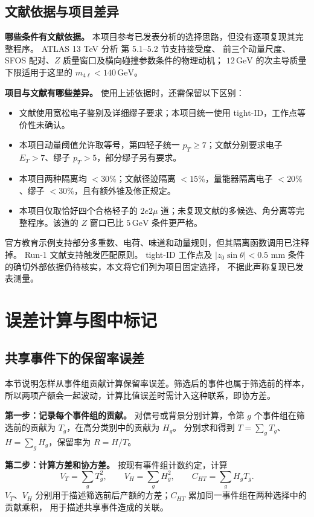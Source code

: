 \documentclass[11pt,a4paper,fontset=fandol,scheme=plain]{ctexart}
\newcommand{\gev}{\,\mathrm{GeV}}
\begin{document}
\subsection{文献依据与项目差异}
\textbf{哪些条件有文献依据。} 本项目参考已发表分析的选择思路，但没有逐项复现其完整程序。
ATLAS 13 TeV 分析\cite{ATLAS13} 第 5.1--5.2 节支持接受度、
前三个动量尺度、SFOS 配对、$Z$ 质量窗口及横向碰撞参数条件的物理动机；
$12\gev$ 的次主导质量下限适用于这里的 $m_{4\ell}<140\gev$。

\textbf{项目与文献有哪些差异。} 使用上述依据时，还需保留以下区别：
\begin{itemize}[itemsep=1pt,topsep=2pt]
\item 文献使用宽松电子鉴别及详细缪子要求；本项目统一使用 tight-ID，工作点等价性未确认。
\item 本项目动量阈值允许取等号，第四轻子统一 $p_T\geq7$；文献分别要求电子 $E_T>7$、缪子 $p_T>5$，部分缪子另有要求。
\item 本项目两种隔离均 $<30\%$；文献径迹隔离 $<15\%$，量能器隔离电子 $<20\%$、缪子 $<30\%$，且有额外锥及修正规定。
\item 本项目仅取恰好四个合格轻子的 $2e2\mu$ 道；未复现文献的多候选、角分离等完整程序。该道的 $Z$ 窗口已比 $5\gev$ 条件更严格。
\end{itemize}
官方教育示例\cite{HZZCuts,HZZAnalysis}支持部分多重数、电荷、味道和动量规则，但其隔离函数调用已注释掉。
Run-1 文献\cite{ATLASRun1}支持触发匹配原则。
tight-ID 工作点及 $|z_0\sin\theta|<0.5$ mm 条件的确切外部依据仍待核实，本文将它们列为项目固定选择，
不据此声称复现已发表测量。
\FloatBarrier

\section{误差计算与图中标记}\label{app:errors}

\subsection{共享事件下的保留率误差}
本节说明怎样从事件组贡献计算保留率误差。筛选后的事件也属于筛选前的样本，
所以两项产额会一起波动，计算比值误差时需计入这种联系，即协方差。

\textbf{第一步：记录每个事件组的贡献。}
对信号或背景分别计算，令第 $g$ 个事件组在筛选前的贡献为 $T_g$，在高分类别中的贡献为 $H_g$。
分别求和得到 $T=\sum_g T_g$、$H=\sum_g H_g$，保留率为 $R=H/T$。

\textbf{第二步：计算方差和协方差。}
按现有事件组计数约定，计算
\[
 V_T=\sum_g T_g^2,\qquad V_H=\sum_g H_g^2,\qquad C_{HT}=\sum_g H_gT_g.
\]
$V_T$、$V_H$ 分别用于描述筛选前后产额的方差；$C_{HT}$ 累加同一事件组在两种选择中的贡献乘积，
用于描述共享事件造成的关联。
\end{document}
